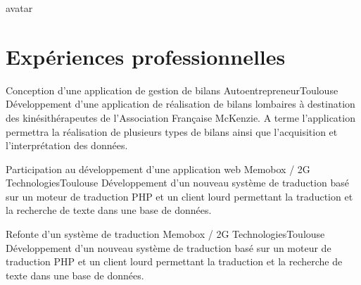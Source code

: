 \documentclass{my_cv_bis}
\begin{document}
 {
}{avatar}

%


 
 \vspace{-2mm}
\section{Expériences professionnelles}
	{Conception d’une application de gestion de bilans}
	{Autoentrepreneur}{Toulouse}
	{
	Développement d'une application de réalisation de bilans lombaires à destination des kinésithérapeutes 
	de l'Association Française McKenzie. A terme l'application permettra la réalisation de plusieurs types de bilans ainsi que
	l'acquisition et l'interprétation des données.
	}
	{}

	{ Participation au développement d'une application web}
	{Memobox / 2G Technologies}{Toulouse}
	{Développement d'un nouveau système de traduction basé sur un moteur de traduction PHP et un client lourd
	permettant la traduction et la recherche de texte dans une base de données.  } {}

	{ Refonte d’un système de traduction }
	{Memobox / 2G Technologies}{Toulouse}
	{Développement d'un nouveau système de traduction basé sur un moteur de traduction PHP et un client lourd
	permettant la traduction et la recherche de texte dans une base de données.  } {}
\end{document}
